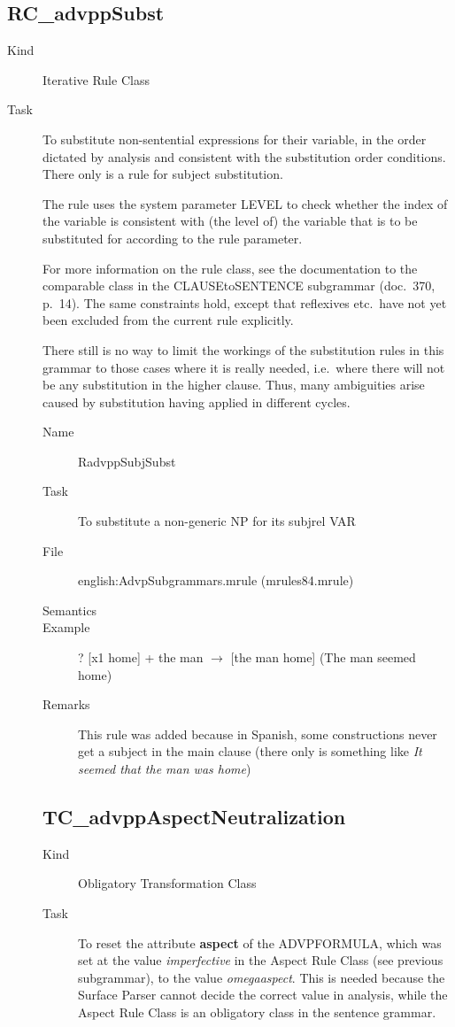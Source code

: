 \newpage
\subsection{RC\_advppSubst}
\begin{description}
\item[Kind] Iterative Rule Class
\item[Task] To substitute non-sentential expressions for their variable, in the 
order dictated by analysis and consistent with the substitution order 
conditions. There only is a rule for subject substitution.

The rule uses the system parameter LEVEL to check whether the index of the 
variable is consistent with (the level of) the variable that is to be 
substituted for according to the rule parameter.

For more information on the rule class, see the documentation to the comparable 
class in the CLAUSEtoSENTENCE subgrammar (doc.\ 370, p.\ 14). The same 
constraints hold, except that reflexives etc.\ have not yet been excluded from 
the current rule explicitly. 

There still is no way to limit the workings of the substitution rules in this 
grammar to those cases where it is really needed, i.e.\ where there will not be 
any substitution in the higher clause. Thus, many ambiguities arise caused by
substitution having applied in different cycles.

\vspace{1 cm}
\begin{description}
\item[Name] RadvppSubjSubst
\item[Task] To substitute a non-generic NP for its subjrel VAR
\item[File] english:AdvpSubgrammars.mrule (mrules84.mrule)
\item[Semantics]
\item[Example] ? [x1 home] + the man $\rightarrow$ [the man home] (The man 
seemed home)
\item[Remarks] This rule was added because in Spanish, some constructions never 
get a subject in the main clause (there only is something like {\em It seemed 
that the man was home\/})
\end{description}

\newpage
\subsection{TC\_advppAspectNeutralization}
\begin{description}
\item[Kind] Obligatory Transformation Class
\item[Task] To reset the attribute {\bf aspect} of the ADVPFORMULA, which was  
set at the value {\em imperfective\/} in the Aspect Rule Class (see previous 
subgrammar), to the 
value {\em omegaaspect\/}. This is needed because the Surface Parser cannot 
decide the correct value in analysis, while the Aspect Rule Class is an 
obligatory class in the sentence grammar.


\end{description}
\end{description}
